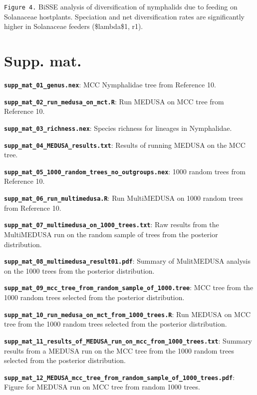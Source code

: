 \documentclass[10pt]{article}
\begin{document}
\texttt{Figure 4.} BiSSE analysis of diversification of nymphalids due
to feeding on Solanaceae hostplants. Speciation and net diversification
rates are significantly higher in Solanaceae feeders (\$lambda\$1, r1).



\section*{Supp. mat.}

\textbf{\texttt{supp\_mat\_01\_genus.nex}}: MCC Nymphalidae tree from
Reference 10.

\textbf{\texttt{supp\_mat\_02\_run\_medusa\_on\_mct.R}}: Run MEDUSA on
MCC tree from Reference 10.

\textbf{\texttt{supp\_mat\_03\_richness.nex}}: Species richness for
lineages in Nymphalidae.

\textbf{\texttt{supp\_mat\_04\_MEDUSA\_results.txt}}: Results of running
MEDUSA on the MCC tree.

\textbf{\texttt{supp\_mat\_05\_1000\_random\_trees\_no\_outgroups.nex}}:
1000 random trees from Reference 10.

\textbf{\texttt{supp\_mat\_06\_run\_multimedusa.R}}: Run MultiMEDUSA on
1000 random trees from Reference 10.

\textbf{\texttt{supp\_mat\_07\_multimedusa\_on\_1000\_trees.txt}}: Raw
results from the MultiMEDUSA run on the random sample of trees from the
posterior distribution.

\textbf{\texttt{supp\_mat\_08\_multimedusa\_result01.pdf}}: Summary of
MulitMEDUSA analysis on the 1000 trees from the posterior distribution.

\textbf{\texttt{supp\_mat\_09\_mcc\_tree\_from\_random\_sample\_of\_1000.tree}}:
MCC tree from the 1000 random trees selected from the posterior
distribution.

\textbf{\texttt{supp\_mat\_10\_run\_medusa\_on\_mct\_from\_1000\_trees.R}}:
Run MEDUSA on MCC tree from the 1000 random trees selected from the
posterior distribution.

\textbf{\texttt{supp\_mat\_11\_results\_of\_MEDUSA\_run\_on\_mcc\_from\_1000\_trees.txt}}:
Summary results from a MEDUSA run on the MCC tree from the 1000 random
trees selected from the posterior distribution.

\textbf{\texttt{supp\_mat\_12\_MEDUSA\_mcc\_tree\_from\_random\_sample\_of\_1000\_trees.pdf}}:
Figure for MEDUSA run on MCC tree from random 1000 trees.
\end{document}
